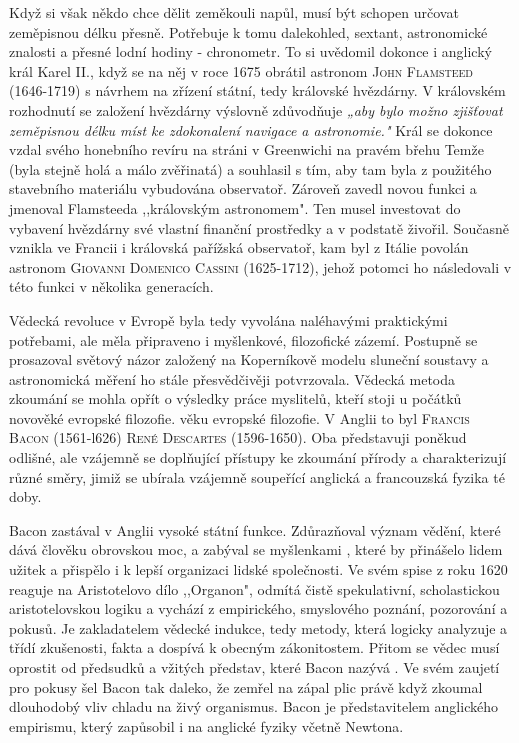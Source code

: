       Když si však někdo chce dělit zeměkouli napůl, musí být schopen určovat zeměpisnou délku
      přesně. Potřebuje k tomu dalekohled, sextant, astronomické znalosti a přesné lodní hodiny -
      chronometr. To si uvědomil dokonce i anglický král Karel II., když se na něj v roce 1675
      obrátil astronom \textsc{John Flamsteed} (1646-1719) s návrhem na zřízení státní, tedy
      královské hvězdárny. V královském rozhodnutí se založení hvězdárny výslovně zdůvodňuje
      \emph{„aby bylo možno zjišťovat zeměpisnou délku míst ke zdokonalení navigace a astronomie."}
      Král se dokonce vzdal svého honebního revíru na stráni v Greenwichi na pravém břehu Temže
      (byla stejně holá a málo zvěřinatá) a souhlasil s tím, aby tam byla z použitého stavebního
      materiálu vybudována observatoř. Zároveň zavedl novou funkci a jmenoval Flamsteeda
      ,,královským astronomem". Ten musel investovat do vybavení hvězdárny své vlastní finanční
      prostředky a v podstatě živořil. Současně vznikla ve Francii i královská pařížská observatoř,
      kam byl z Itálie povolán astronom \textsc{Giovanni Domenico Cassini} (1625-1712), jehož
      potomci ho následovali v této funkci v několika generacích.

      Vědecká revoluce v Evropě byla tedy vyvolána naléhavými praktickými potřebami, ale měla
      připraveno i myšlenkové, filozofické zázemí. Postupně se prosazoval světový názor založený na
      Koperníkově modelu sluneční soustavy a astronomická měření ho stále přesvědčivěji potvrzovala.
      Vědecká metoda zkoumání se mohla opřít o výsledky práce myslitelů, kteří stoji u počátků
      novověké evropské filozofie. věku evropské filozofie. V Anglii to byl \textsc{Francis Bacon}
      (1561-l626) \textsc{René Descartes} (1596-1650). Oba představuji poněkud odlišné, ale vzájemně
      se doplňující přístupy ke zkoumání přírody a charakterizují různé směry, jimiž se ubírala
      vzájemně soupeřící anglická a francouzská fyzika té doby. 
      
      Bacon zastával v Anglii vysoké státní funkce. Zdůrazňoval význam vědění, které dává člověku
      obrovskou moc, a zabýval se myšlenkami , které by přinášelo lidem
      užitek a přispělo i k lepší organizaci lidské společnosti. Ve svém spise  z
      roku 1620 reaguje na Aristotelovo dílo ,,Organon", odmítá čistě spekulativní, scholastickou
      aristotelovskou logiku a vychází z empirického, smyslového poznání, pozorování a pokusů. Je
      zakladatelem vědecké indukce, tedy metody, která logicky analyzuje a třídí zkušenosti, fakta a
      dospívá k obecným zákonitostem. Přitom se vědec musí oprostit od předsudků a vžitých představ,
      které Bacon nazývá  . Ve svém zaujetí pro pokusy šel Bacon tak daleko, že zemřel na
      zápal plic právě když zkoumal dlouhodobý vliv chladu na živý organismus. Bacon je
      představitelem anglického empirismu, který zapůsobil i na anglické fyziky včetně Newtona.  
      
